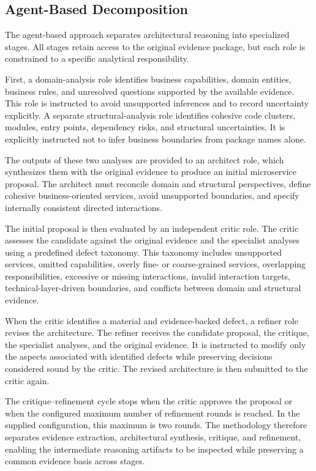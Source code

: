 \documentclass[acmsmall,screen,anonymous,review]{acmart}
\begin{document}
\subsection{Agent-Based Decomposition}

The agent-based approach separates architectural reasoning into specialized stages. All stages retain access to the original evidence package, but each role is constrained to a specific analytical responsibility.

First, a domain-analysis role identifies business capabilities, domain entities, business rules, and unresolved questions supported by the available evidence. This role is instructed to avoid unsupported inferences and to record uncertainty explicitly. A separate structural-analysis role identifies cohesive code clusters, modules, entry points, dependency risks, and structural uncertainties. It is explicitly instructed not to infer business boundaries from package names alone.

The outputs of these two analyses are provided to an architect role, which synthesizes them with the original evidence to produce an initial microservice proposal. The architect must reconcile domain and structural perspectives, define cohesive business-oriented services, avoid unsupported boundaries, and specify internally consistent directed interactions.

The initial proposal is then evaluated by an independent critic role. The critic assesses the candidate against the original evidence and the specialist analyses using a predefined defect taxonomy. This taxonomy includes unsupported services, omitted capabilities, overly fine- or coarse-grained services, overlapping responsibilities, excessive or missing interactions, invalid interaction targets, technical-layer-driven boundaries, and conflicts between domain and structural evidence.

When the critic identifies a material and evidence-backed defect, a refiner role revises the architecture. The refiner receives the candidate proposal, the critique, the specialist analyses, and the original evidence. It is instructed to modify only the aspects associated with identified defects while preserving decisions considered sound by the critic. The revised architecture is then submitted to the critic again.

The critique--refinement cycle stops when the critic approves the proposal or when the configured maximum number of refinement rounds is reached. In the supplied configuration, this maximum is two rounds. The methodology therefore separates evidence extraction, architectural synthesis, critique, and refinement, enabling the intermediate reasoning artifacts to be inspected while preserving a common evidence basis across stages.
\end{document}
